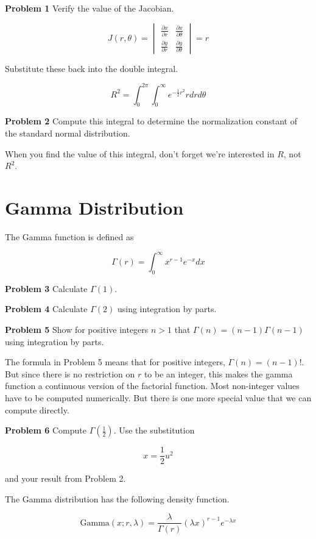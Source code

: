\documentclass[]{article}
\begin{document}
\textbf{Problem 1} Verify the value of the Jacobian.

$$
J(r,\theta) =
\begin{vmatrix}
\frac{\partial x}{\partial r} & \frac{\partial x}{\partial \theta} \\
\frac{\partial y}{\partial r} & \frac{\partial y}{\partial \theta}
\end{vmatrix} = r
$$

Substitute these back into the double integral.

$$
R^2 = \int_{0}^{2\pi} \int_{0}^{\infty}
       e^{-\frac{1}{2} r^2} r  dr d\theta \label{p1}
$$

\textbf{Problem 2} Compute this integral to determine the
normalization constant of the standard normal distribution.

When you find the value of this integral, don't forget we're
interested in $R$, not $R^2$.


\section*{Gamma Distribution}

The Gamma function is defined as

$$
\Gamma(r) = \int_0^{\infty} x^{r-1} e^{-x}dx
$$

\textbf{Problem 3} Calculate $\Gamma(1)$.

\textbf{Problem 4} Calculate $\Gamma(2)$ using integration
by parts.

\textbf{Problem 5} Show for positive integers $n > 1$ that
$\Gamma(n) = (n-1)\Gamma(n-1)$ using integration by parts. 

The formula in Problem 5 means that for positive integers,
$\Gamma(n) = (n-1)!$.  But since there is no restriction on
$r$ to be an integer, this makes the gamma function a 
continuous version of the factorial function.  Most non-integer
values have to be computed numerically.  But there is one more
special value that we can compute directly.

\textbf{Problem 6} Compute $\Gamma \left(\frac{1}{2} \right)$.
Use the substitution

$$
x = \frac{1}{2}u^2
$$

and your result from Problem 2.

The Gamma distribution has the following density function.

$$
\mbox{Gamma}(x; r, \lambda) = \frac{\lambda}{\Gamma(r)} 
                  (\lambda x)^{r-1} e^{-\lambda x}
$$
\end{document}
